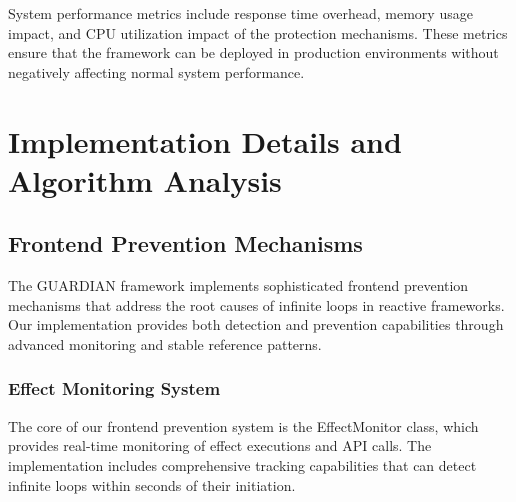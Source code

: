 \documentclass[10pt]{article}
\begin{document}
System performance metrics include response time overhead, memory usage impact, and CPU utilization impact of the protection mechanisms. These metrics ensure that the framework can be deployed in production environments without negatively affecting normal system performance.

\section{Implementation Details and Algorithm Analysis}

\subsection{Frontend Prevention Mechanisms}

The GUARDIAN framework implements sophisticated frontend prevention mechanisms that address the root causes of infinite loops in reactive frameworks. Our implementation provides both detection and prevention capabilities through advanced monitoring and stable reference patterns.

\subsubsection{Effect Monitoring System}

The core of our frontend prevention system is the EffectMonitor class, which provides real-time monitoring of effect executions and API calls. The implementation includes comprehensive tracking capabilities that can detect infinite loops within seconds of their initiation.
\end{document}
